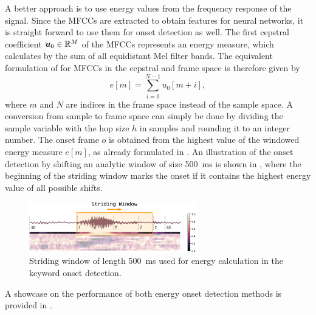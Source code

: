 A better approach is to use energy values from the frequency response of the signal.
Since the MFCCs are extracted to obtain features for neural networks, it is straight forward to use them for onset detection as well.
The first cepstral coefficient $\bm{u}_0 \in \mathbb{R}^M$ of the MFCCs represents an energy measure, which calculates by the sum of all equidistant Mel filter bands.
The equivalent formulation of  for MFCCs in the cepstral and frame space is therefore given by
\begin{equation}
  e[m] = \sum_{i=0}^{N-1} u_0[m + i],
\end{equation}
where $m$ and $N$ are indices in the frame space instead of the sample space.
A conversion from sample to frame space can simply be done by dividing the sample variable with the hop size $h$ in samples and rounding it to an integer number.
The onset frame $o$ is obtained from the highest value of the windowed energy measure $e[m]$, as already formulated in .
An illustration of the onset detection by shifting an analytic window of size \SI{500}{\milli\second} is shown in , where
the beginning of the striding window marks the onset if it contains the highest energy value of all possible shifts.
\begin{figure}[!ht]
  \centering
    \includegraphics[width=0.65\textwidth]{./3_signal/figs/signal_onset_window.pdf}
  \caption{Striding window of length \SI{500}{\milli\second} used for energy calculation in the keyword onset detection.}
  \label{fig:signal_onset_window}
\end{figure}
\FloatBarrier
\noindent
A showcase on the performance of both energy onset detection methods is provided in .
